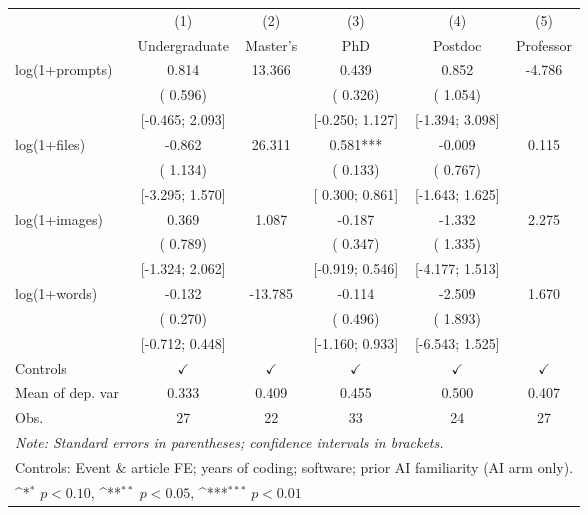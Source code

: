 \def\sym#1{\ifmmode^{#1}\else\(^{#1}\)\fi}
\begin{tabular}{l*{5}{c}}
\hline\hline
 & (1) & (2) & (3) & (4) & (5)
\\
 & Undergraduate & Master's & PhD & Postdoc & Professor
 \\
\hline
log(1+prompts) &  0.814 &  13.366 &  0.439 &  0.852 & -4.786
\\
 & ( 0.596) &  & ( 0.326) & ( 1.054) & 
\\
 & [-0.465;  2.093] &  & [-0.250;  1.127] & [-1.394;  3.098] & 
\\
log(1+files) & -0.862 &  26.311 &  0.581*** & -0.009 &  0.115
\\
 & ( 1.134) &  & ( 0.133) & ( 0.767) & 
\\
 & [-3.295;  1.570] &  & [ 0.300;  0.861] & [-1.643;  1.625] & 
\\
log(1+images) &  0.369 &  1.087 & -0.187 & -1.332 &  2.275
\\
 & ( 0.789) &  & ( 0.347) & ( 1.335) & 
\\
 & [-1.324;  2.062] &  & [-0.919;  0.546] & [-4.177;  1.513] & 
\\
log(1+words) & -0.132 & -13.785 & -0.114 & -2.509 &  1.670
\\
 & ( 0.270) &  & ( 0.496) & ( 1.893) & 
\\
 & [-0.712;  0.448] &  & [-1.160;  0.933] & [-6.543;  1.525] & 
\\
\hline
Controls & $\checkmark$ & $\checkmark$ & $\checkmark$ & $\checkmark$ & $\checkmark$
\\
Mean of dep. var &  0.333 &  0.409 &  0.455 &  0.500 &  0.407
\\
Obs. & 27 & 22 & 33 & 24 & 27
\\
\hline
\hline\hline
\multicolumn{6}{l}{\it{Note:} Standard errors in parentheses; confidence intervals in brackets.}\\
\multicolumn{6}{l}{Controls: Event \& article FE; years of coding; software; prior AI familiarity (AI arm only).}\\
\multicolumn{6}{l}{\sym{*} $p<0.10$, \sym{**} $p<0.05$,  \sym{***} $p<0.01$}\\
\end{tabular}
